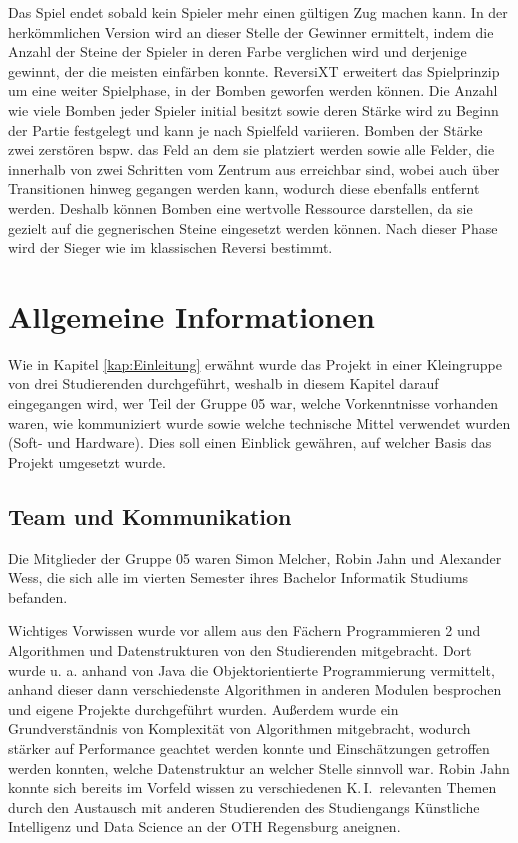 \documentclass[12pt,a4paper,bibliography=totocnumbered,listof=totocnumbered]{article}
\begin{document}
Das Spiel endet sobald kein Spieler mehr einen gültigen Zug machen kann. In der herkömmlichen Version wird an dieser Stelle der Gewinner ermittelt, indem die Anzahl der Steine der Spieler in deren Farbe verglichen wird und derjenige gewinnt, der die meisten einfärben konnte. ReversiXT erweitert das Spielprinzip um eine weiter Spielphase, in der Bomben geworfen werden können. Die Anzahl wie viele Bomben jeder Spieler initial besitzt sowie deren Stärke wird zu Beginn der Partie festgelegt und kann je nach Spielfeld variieren. Bomben der Stärke zwei zerstören bspw. das Feld an dem sie platziert werden sowie alle Felder, die innerhalb von zwei Schritten vom Zentrum aus erreichbar sind, wobei auch über Transitionen hinweg gegangen werden kann, wodurch diese ebenfalls entfernt werden. Deshalb können Bomben eine wertvolle Ressource darstellen, da sie gezielt auf die gegnerischen Steine eingesetzt werden können. Nach dieser Phase wird der Sieger wie im klassischen Reversi bestimmt.


\newpage
\section{Allgemeine Informationen}
Wie in Kapitel \ref{kap:Einleitung} erwähnt wurde das Projekt in einer Kleingruppe von drei Studierenden durchgeführt, weshalb in diesem Kapitel darauf eingegangen wird, wer Teil der Gruppe 05 war, welche Vorkenntnisse vorhanden waren, wie kommuniziert wurde sowie welche technische Mittel verwendet wurden (Soft- und Hardware). Dies soll einen Einblick gewähren, auf welcher Basis das Projekt umgesetzt wurde.

\subsection{Team und Kommunikation}
Die Mitglieder der Gruppe 05 waren Simon Melcher, Robin Jahn und Alexander Wess, die sich alle im vierten Semester ihres Bachelor Informatik Studiums befanden.

Wichtiges Vorwissen wurde vor allem aus den Fächern Programmieren 2 und Algorithmen und Datenstrukturen von den Studierenden mitgebracht. Dort wurde u. a. anhand von Java die Objektorientierte Programmierung vermittelt, anhand dieser dann verschiedenste Algorithmen in anderen Modulen besprochen und eigene Projekte durchgeführt wurden. Außerdem wurde ein Grundverständnis von Komplexität von Algorithmen mitgebracht, wodurch stärker auf Performance geachtet werden konnte und Einschätzungen getroffen werden konnten, welche Datenstruktur an welcher Stelle sinnvoll war. Robin Jahn konnte sich bereits im Vorfeld wissen zu verschiedenen K.\,I.\ relevanten Themen durch den Austausch mit anderen Studierenden des Studiengangs \glqq Künstliche Intelligenz und Data Science \grqq{} an der OTH Regensburg aneignen.
\end{document}

